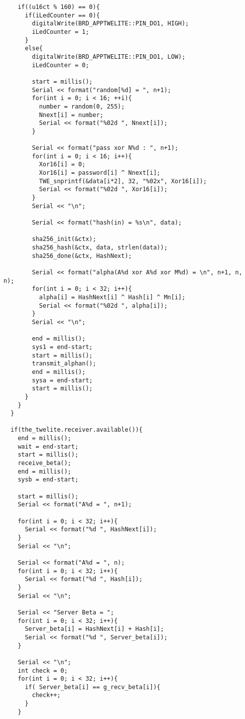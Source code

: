 \documentclass{thesis}
\begin{document}
\begin{lstlisting}
    if((u16ct % 160) == 0){
      if(iLedCounter == 0){
        digitalWrite(BRD_APPTWELITE::PIN_DO1, HIGH);
        iLedCounter = 1;
      }
      else{
        digitalWrite(BRD_APPTWELITE::PIN_DO1, LOW);
        iLedCounter = 0;

        start = millis();
        Serial << format("random[%d] = ", n+1);
        for(int i = 0; i < 16; ++i){
          number = random(0, 255);
          Nnext[i] = number;
          Serial << format("%02d ", Nnext[i]);
        }

        Serial << format("pass xor N%d : ", n+1);
        for(int i = 0; i < 16; i++){
          Xor16[i] = 0;
          Xor16[i] = password[i] ^ Nnext[i];
          TWE_snprintf(&data[i*2], 32, "%02x", Xor16[i]);
          Serial << format("%02d ", Xor16[i]);
        }
        Serial << "\n";

        Serial << format("hash(in) = %s\n", data);

        sha256_init(&ctx);
        sha256_hash(&ctx, data, strlen(data));
        sha256_done(&ctx, HashNext);

        Serial << format("alpha(A%d xor A%d xor M%d) = \n", n+1, n, n);
        for(int i = 0; i < 32; i++){
          alpha[i] = HashNext[i] ^ Hash[i] ^ Mn[i];
          Serial << format("%02d ", alpha[i]);
        }
        Serial << "\n";

        end = millis();
        sys1 = end-start;
        start = millis();
        transmit_alphan();
        end = millis();
        sysa = end-start;
        start = millis();
      }
    }
  }

  if(the_twelite.receiver.available()){
    end = millis();
    wait = end-start;
    start = millis();
    receive_beta();
    end = millis();
    sysb = end-start;

    start = millis();
    Serial << format("A%d = ", n+1);

    for(int i = 0; i < 32; i++){
      Serial << format("%d ", HashNext[i]);
    }
    Serial << "\n";

    Serial << format("A%d = ", n);
    for(int i = 0; i < 32; i++){
      Serial << format("%d ", Hash[i]);
    }
    Serial << "\n";

    Serial << "Server Beta = ";
    for(int i = 0; i < 32; i++){
      Server_beta[i] = HashNext[i] + Hash[i];
      Serial << format("%d ", Server_beta[i]);
    }

    Serial << "\n";
    int check = 0;
    for(int i = 0; i < 32; i++){
      if( Server_beta[i] == g_recv_beta[i]){
        check++;
      }
    }


\end{lstlisting}
\end{document}
